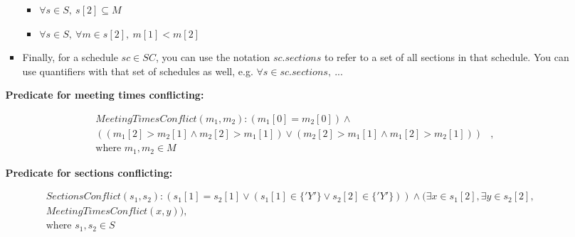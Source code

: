 \documentclass[fontsize=11pt]{article}
\begin{document}
\begin{enumerate}
\begin{enumerate}
\begin{itemize}
                          \begin{itemize}
                              \item $\forall s \in S,~ s[2] \subseteq M$
                              \item $\forall s \in S,~ \forall m \in s[2],~ m[1] < m[2]$
                          \end{itemize}

                    \item
                          Finally, for a schedule $sc \in SC$, you can use the notation $sc.sections$ to refer to a set of all sections in that schedule.
                          You can use quantifiers with that set of schedules as well, e.g.
                          $\forall s \in sc.sections,~ ...$
                \end{itemize}

                \textbf{Predicate for meeting times conflicting:}


                \begin{align*}
                    MeetingTimesConflict(m_1, m_2) : (m_1[0] = m_2[0]) \land                               &   \\
                    ((m_1[2] > m_2[1] \land m_2[2] > m_1[1]) \lor (m_2[2] > m_1[1] \land m_1[2] > m_2[1])) & , \\
                    \text{where $m_1, m_2 \in M$}                                                          &
                \end{align*}

                \smallskip

                \textbf{Predicate for sections conflicting:}


                \begin{align*}
                    SectionsConflict(s_1, s_2) : (s_1[1] = s_2[1] \lor (s_1[1] \in \{'Y'\} \lor s_2[2] \in \{'Y'\})) \land (\exists x \in s_1[2], \exists y \in s_2[2], & \\
                    MeetingTimesConflict(x, y)),                                                                                                                        & \\
                    \text{where $s_1, s_2 \in S$}                                                                                                                       &
                \end{align*}

                \smallskip


\end{enumerate}
\end{enumerate}
\end{document}
